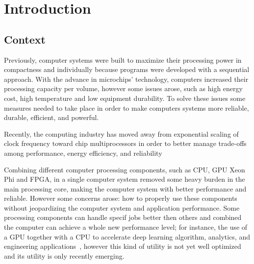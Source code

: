 \chapter{Introduction} \label{chap:intro}

\section*{}
\section{Context} \label{sec:context}

Previously, computer systems were built to maximize their processing power in compactness and individually because programs were developed with a sequential approach. With the advance in microchips' technology, computers increased their processing capacity per volume, however some issues arose, such as high energy cost, high temperature and low equipment durability. To solve these issues some measures needed to take place in order to make computers systems more reliable, durable, efficient, and powerful.

Recently, the computing industry has moved away from exponential scaling of clock frequency toward chip multiprocessors in order to better manage trade-offs among performance, energy efficiency, and reliability~\cite{Datta2008}

Combining different computer processing components, such as CPU, GPU Xeon Phi and FPGA, in a single computer system removed some heavy burden in the main processing core, making the computer system with better performance and reliable. However some concerns arose: how to properly use these components without jeopardizing the computer system and application performance. Some processing components can handle specif jobs better then others and combined the computer can achieve a whole new performance level; for instance, the use of a GPU together with a CPU to accelerate deep learning algorithm, analytics, and engineering applications~\cite{NvidiaGPU}, however this kind of utility is not yet well optimized and its utility is only recently emerging.



